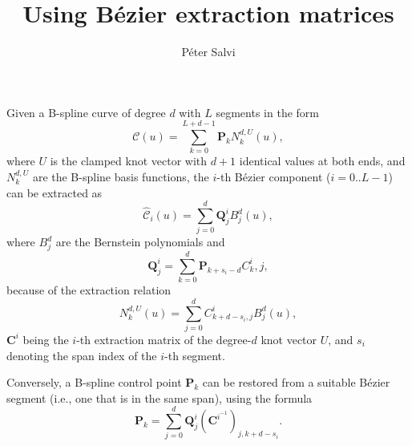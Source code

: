 \documentclass{article}
\begin{document}
\title{Using B\'ezier extraction matrices}
\author{P\'eter Salvi}
\maketitle
Given a B-spline curve of degree $d$ with $L$ segments in the form
\[\mathcal{C}(u)=\sum_{k=0}^{L+d-1}\mathbf{P}_kN_k^{d,U}(u),\]
where $U$ is the clamped knot vector with $d+1$ identical values at both ends,
and $N_k^{d,U}$ are the B-spline basis functions, the $i$-th B\'ezier component ($i=0..L-1$)
can be extracted as
\[\hat{\mathcal{C}}_i(u)=\sum_{j=0}^d\mathbf{Q}_j^iB_j^d(u),\]
where $B_j^d$ are the Bernstein polynomials and
\[\mathbf{Q}_j^i=\sum_{k=0}^d\mathbf{P}_{k+s_i-d}C^i_k,j,\]
because of the extraction relation
\[N_k^{d,U}(u)=\sum_{j=0}^dC^i_{k+d-s_i,j}B_j^d(u),\]
$\mathbf{C}^i$ being the $i$-th extraction matrix of the degree-$d$ knot vector $U$,
and $s_i$ denoting the span index of the $i$-th segment.

Conversely, a B-spline control point $\mathbf{P}_k$ can be restored from a
suitable B\'ezier segment (i.e., one that is in the same span), using the formula
\[\mathbf{P}_k=\sum_{j=0}^d\mathbf{Q}_j^i\left(\mathbf{C}^{i^{-1}}\right)_{j,k+d-s_i}.\]
\end{document}
